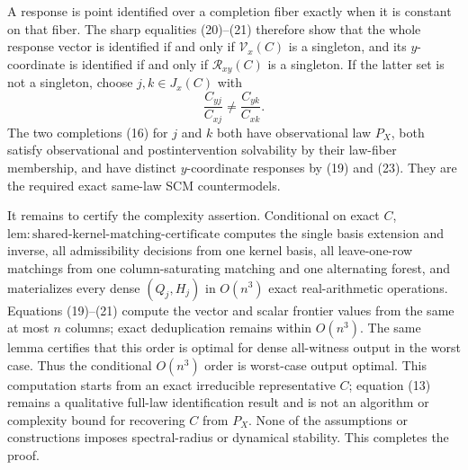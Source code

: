 A response is point identified over a completion fiber exactly when it is constant on that fiber. The sharp equalities (20)--(21) therefore show that the whole response vector is identified if and only if \(\mathcal V_x(C)\) is a singleton, and its \(y\)-coordinate is identified if and only if \(\mathcal R_{xy}(C)\) is a singleton. If the latter set is not a singleton, choose \(j,k\in J_x(C)\) with
\[
 \frac{C_{yj}}{C_{xj}}\ne\frac{C_{yk}}{C_{xk}}. \tag{23}
\]
The two completions (16) for \(j\) and \(k\) both have observational law \(P_X\), both satisfy observational and postintervention solvability by their law-fiber membership, and have distinct \(y\)-coordinate responses by (19) and (23). They are the required exact same-law SCM countermodels.

It remains to certify the complexity assertion. Conditional on exact \(C\), \(\mathrm{lem:shared\text{-}kernel\text{-}matching\text{-}certificate}\) computes the single basis extension and inverse, all admissibility decisions from one kernel basis, all leave-one-row matchings from one column-saturating matching and one alternating forest, and materializes every dense \((Q_j,H_j)\) in \(O(n^3)\) exact real-arithmetic operations. Equations (19)--(21) compute the vector and scalar frontier values from the same at most \(n\) columns; exact deduplication remains within \(O(n^3)\). The same lemma certifies that this order is optimal for dense all-witness output in the worst case. Thus the conditional \(O(n^3)\) order is worst-case output optimal. This computation starts from an exact irreducible representative \(C\); equation (13) remains a qualitative full-law identification result and is not an algorithm or complexity bound for recovering \(C\) from \(P_X\). None of the assumptions or constructions imposes spectral-radius or dynamical stability. This completes the proof.
